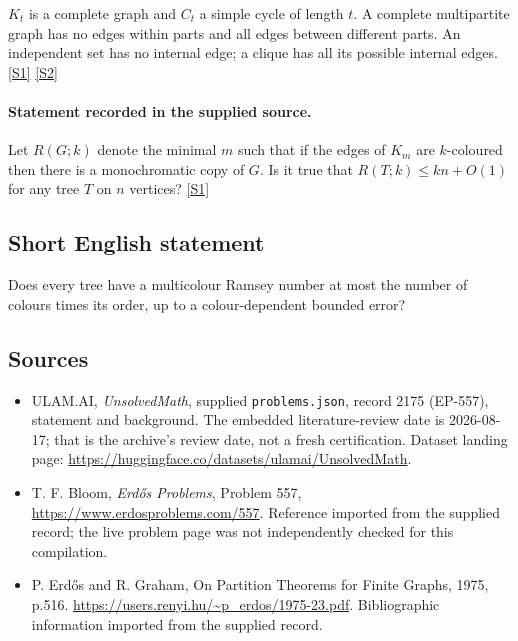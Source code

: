 \documentclass[11pt,a4paper]{article}
\newcommand{\sref}[2]{\hyperlink{source:#1:#2}{[S#2]}}
\begin{document}
$K_t$ is a complete graph and $C_t$ a simple cycle of length $t$. A complete multipartite graph has no edges within parts and all edges between different parts. An independent set has no internal edge; a clique has all its possible internal edges. \sref{2175}{1} \sref{2175}{2}

\paragraph{Statement recorded in the supplied source.}
Let $R(G;k)$ denote the minimal $m$ such that if the edges of $K_m$ are $k$-coloured then there is a monochromatic copy of $G$. Is it true that $ R(T;k)\leq kn+O(1) $ for any tree $T$ on $n$ vertices? \sref{2175}{1}

\subsection{Short English statement}

Does every tree have a multicolour Ramsey number at most the number of colours times its order, up to a colour-dependent bounded error?

\subsection{Sources}

{\small

\begin{itemize}

\item[\hypertarget{source:2175:1}{S1}] ULAM.AI, \emph{UnsolvedMath}, supplied \texttt{problems.json}, record 2175 (EP-557), statement and background. The embedded literature-review date is 2026-08-17; that is the archive’s review date, not a fresh certification. Dataset landing page: \url{https://huggingface.co/datasets/ulamai/UnsolvedMath}.

\item[\hypertarget{source:2175:2}{S2}] T. F. Bloom, \emph{Erdős Problems}, Problem 557, \url{https://www.erdosproblems.com/557}. Reference imported from the supplied record; the live problem page was not independently checked for this compilation.

\item[\hypertarget{source:2175:3}{S3}] P. Erdős and R. Graham, On Partition Theorems for Finite Graphs, 1975, p.516. \url{https://users.renyi.hu/~p_erdos/1975-23.pdf}. Bibliographic information imported from the supplied record.

\end{itemize}

}

\label{end:2175}
\end{document}
